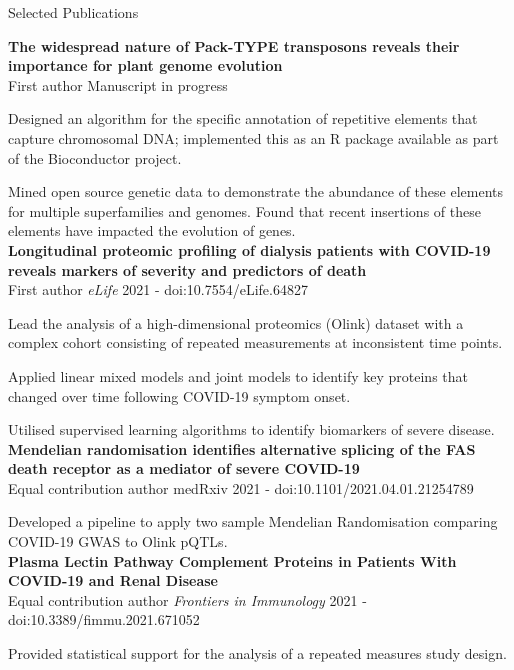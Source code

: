\documentclass{resume}
\begin{document}
\begin{rSection}{Selected Publications}

\textbf{The widespread nature of Pack-TYPE transposons reveals their importance for plant genome evolution} \\
First author \hfill  Manuscript in progress

\smallskip
\item Designed an algorithm for the specific annotation of repetitive elements that capture chromosomal DNA; implemented this as an R package available as part of the Bioconductor project.
\item Mined open source genetic data to demonstrate the abundance of these elements for multiple superfamilies and genomes. Found that recent insertions of these elements have impacted the evolution of genes. \\

\textbf{Longitudinal proteomic profiling of dialysis patients with COVID-19 reveals markers of severity and predictors of death} \\
First author \hfill  \textit{eLife} 2021 - doi:10.7554/eLife.64827

\smallskip
\item Lead the analysis of a high-dimensional proteomics (Olink) dataset with a complex cohort consisting of repeated measurements at inconsistent time points.
\item Applied linear mixed models and joint models to identify key proteins that changed over time following COVID-19 symptom onset.
\item Utilised supervised learning algorithms to identify biomarkers of severe disease.
\\
 
\textbf{Mendelian randomisation identifies alternative splicing of the FAS death receptor as a mediator of severe COVID-19} \\
Equal contribution author \hfill  medRxiv 2021 - doi:10.1101/2021.04.01.21254789

\smallskip
\item Developed a pipeline to apply two sample Mendelian Randomisation comparing COVID-19 GWAS to Olink pQTLs. \\

\textbf{Plasma Lectin Pathway Complement Proteins in Patients With COVID-19 and Renal Disease} \\
Equal contribution author \hfill  \textit{Frontiers in Immunology} 2021 - doi:10.3389/fimmu.2021.671052

\smallskip
\item Provided statistical support for the analysis of a repeated measures study design. \\

\end{rSection}
\end{document}
